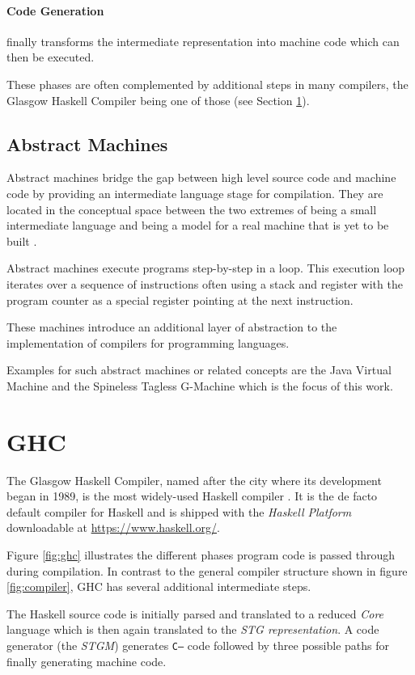 \documentclass[runningheads]{llncs}
\begin{document}
\paragraph{Code Generation} finally transforms the intermediate representation into machine code which can then be executed. 


These phases are often complemented by additional steps in many compilers, the Glasgow Haskell Compiler being one of those (see Section \ref{sec:ghc}).

\subsection{Abstract Machines}
Abstract machines bridge the gap between high level source code and machine code by providing an intermediate language stage for compilation. They are located in the conceptual space between the two extremes of being a small intermediate language and being a model for a real machine that is yet to be built \cite{diehl2000abstract}.

Abstract machines execute programs step-by-step in a loop. This execution loop iterates over a sequence of instructions often using a stack and register with the program counter as a special register pointing at the next instruction. \cite{diehl2000abstract}

These machines introduce an additional layer of abstraction to the implementation of compilers for programming languages.

Examples for such abstract machines or related concepts are the Java Virtual Machine and the Spineless Tagless G-Machine which is the focus of this work.

\section{GHC}
\label{sec:ghc}
The Glasgow Haskell Compiler, named after the city where its development began in 1989, is the most widely-used Haskell compiler \cite{marlow2007faster}. It is the de facto default compiler for Haskell and is shipped with the \textit{Haskell Platform} downloadable at \url{https://www.haskell.org/}.

Figure \ref{fig:ghc} illustrates the different phases program code is passed through during compilation. In contrast to the general compiler structure shown in figure \ref{fig:compiler}, GHC has several additional intermediate steps. 

The Haskell source code is initially parsed and translated to a reduced \textit{Core} language which is then again translated to the \textit{STG representation}. A code generator (the \textit{STGM}) generates \texttt{C--} code followed by three possible paths for finally generating machine code.
\end{document}

